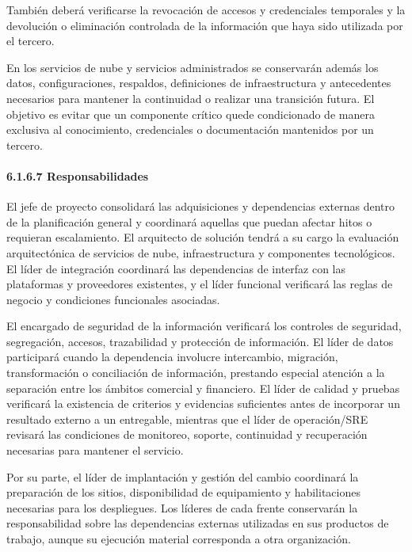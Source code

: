 \documentclass[11pt]{article}
\begin{document}
También deberá verificarse la revocación de accesos y credenciales
temporales y la devolución o eliminación controlada de la información
que haya sido utilizada por el tercero.

En los servicios de nube y servicios administrados se conservarán además
los datos, configuraciones, respaldos, definiciones de infraestructura y
antecedentes necesarios para mantener la continuidad o realizar una
transición futura. El objetivo es evitar que un componente crítico quede
condicionado de manera exclusiva al conocimiento, credenciales o
documentación mantenidos por un tercero.

\paragraph{6.1.6.7 Responsabilidades}\label{6-1-6-7-responsabilidades}

El jefe de proyecto consolidará las adquisiciones y dependencias externas dentro de la planificación general y coordinará aquellas que puedan afectar hitos o requieran escalamiento. El arquitecto de solución tendrá a su cargo la evaluación arquitectónica de servicios de nube, infraestructura y componentes tecnológicos. El líder de integración coordinará las dependencias de interfaz con las plataformas y proveedores existentes, y el líder funcional verificará las reglas de negocio y condiciones funcionales asociadas.

El encargado de seguridad de la información verificará los controles de
seguridad, segregación, accesos, trazabilidad y protección de
información. El líder de datos participará cuando la dependencia
involucre intercambio, migración, transformación o conciliación de
información, prestando especial atención a la separación entre los
ámbitos comercial y financiero. El líder de calidad y pruebas verificará
la existencia de criterios y evidencias suficientes antes de incorporar
un resultado externo a un entregable, mientras que el líder de
operación/SRE revisará las condiciones de monitoreo, soporte,
continuidad y recuperación necesarias para mantener el servicio.

Por su parte, el líder de implantación y gestión del cambio coordinará
la preparación de los sitios, disponibilidad de equipamiento y
habilitaciones necesarias para los despliegues. Los líderes de cada
frente conservarán la responsabilidad sobre las dependencias externas
utilizadas en sus productos de trabajo, aunque su ejecución material
corresponda a otra organización.
\end{document}
